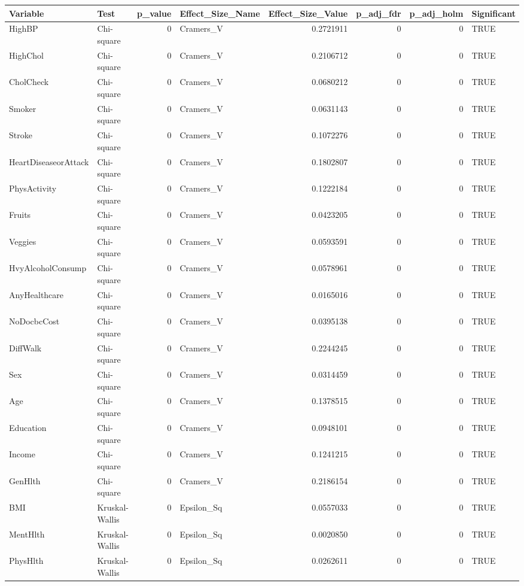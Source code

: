 
\begin{tabular}{llrlrrrl}
\toprule
Variable & Test & p\_value & Effect\_Size\_Name & Effect\_Size\_Value & p\_adj\_fdr & p\_adj\_holm & Significant\\
\midrule
HighBP & Chi-square & 0 & Cramers\_V & 0.2721911 & 0 & 0 & TRUE\\
HighChol & Chi-square & 0 & Cramers\_V & 0.2106712 & 0 & 0 & TRUE\\
CholCheck & Chi-square & 0 & Cramers\_V & 0.0680212 & 0 & 0 & TRUE\\
Smoker & Chi-square & 0 & Cramers\_V & 0.0631143 & 0 & 0 & TRUE\\
Stroke & Chi-square & 0 & Cramers\_V & 0.1072276 & 0 & 0 & TRUE\\
\addlinespace
HeartDiseaseorAttack & Chi-square & 0 & Cramers\_V & 0.1802807 & 0 & 0 & TRUE\\
PhysActivity & Chi-square & 0 & Cramers\_V & 0.1222184 & 0 & 0 & TRUE\\
Fruits & Chi-square & 0 & Cramers\_V & 0.0423205 & 0 & 0 & TRUE\\
Veggies & Chi-square & 0 & Cramers\_V & 0.0593591 & 0 & 0 & TRUE\\
HvyAlcoholConsump & Chi-square & 0 & Cramers\_V & 0.0578961 & 0 & 0 & TRUE\\
\addlinespace
AnyHealthcare & Chi-square & 0 & Cramers\_V & 0.0165016 & 0 & 0 & TRUE\\
NoDocbcCost & Chi-square & 0 & Cramers\_V & 0.0395138 & 0 & 0 & TRUE\\
DiffWalk & Chi-square & 0 & Cramers\_V & 0.2244245 & 0 & 0 & TRUE\\
Sex & Chi-square & 0 & Cramers\_V & 0.0314459 & 0 & 0 & TRUE\\
Age & Chi-square & 0 & Cramers\_V & 0.1378515 & 0 & 0 & TRUE\\
\addlinespace
Education & Chi-square & 0 & Cramers\_V & 0.0948101 & 0 & 0 & TRUE\\
Income & Chi-square & 0 & Cramers\_V & 0.1241215 & 0 & 0 & TRUE\\
GenHlth & Chi-square & 0 & Cramers\_V & 0.2186154 & 0 & 0 & TRUE\\
BMI & Kruskal-Wallis & 0 & Epsilon\_Sq & 0.0557033 & 0 & 0 & TRUE\\
MentHlth & Kruskal-Wallis & 0 & Epsilon\_Sq & 0.0020850 & 0 & 0 & TRUE\\
\addlinespace
PhysHlth & Kruskal-Wallis & 0 & Epsilon\_Sq & 0.0262611 & 0 & 0 & TRUE\\
\bottomrule
\end{tabular}
